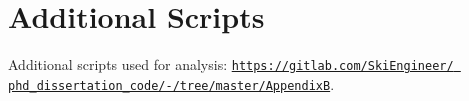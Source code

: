 \documentclass[../Dissertation]{subfiles}
\begin{document}
    
    
\section{Additional Scripts}
    Additional scripts used for analysis:
\href{http://gitlab.com/SkiEngineer/phd_dissertation_code/-/tree/master/AppendixB}
    {\texttt{https://gitlab.com/SkiEngineer/\linebreak
    phd\_dissertation\_code/-/tree/master/AppendixB}}.
    
\end{document}
